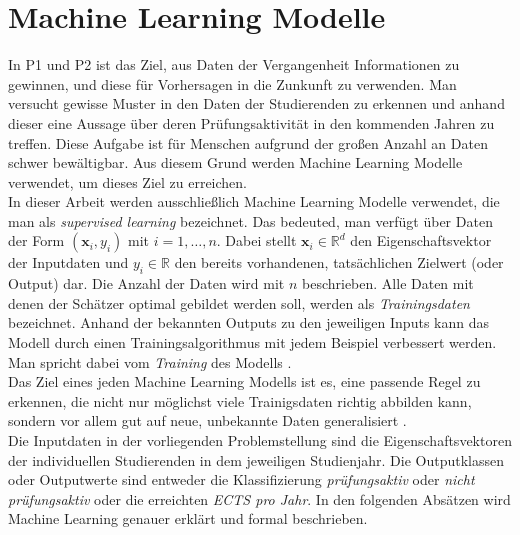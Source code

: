 
\section{Machine Learning Modelle}
\label{sec:ml}

In P1 und P2 ist das Ziel, aus Daten der Vergangenheit Informationen zu gewinnen, und diese f\"ur Vorhersagen in die Zunkunft zu verwenden.
Man versucht gewisse Muster in den Daten der Studierenden zu erkennen und anhand dieser eine Aussage \"uber deren Pr\"ufungsaktivit\"at in den kommenden Jahren zu treffen.
Diese Aufgabe ist f\"ur Menschen aufgrund der gro{\ss}en Anzahl an Daten schwer bew\"altigbar. Aus diesem Grund werden Machine Learning Modelle verwendet,
um dieses Ziel zu erreichen. \\

In dieser Arbeit werden ausschlie{\ss}lich Machine Learning Modelle verwendet, die man als \textit{supervised learning} bezeichnet.
Das bedeuted, man verf\"ugt \"uber Daten der Form $(\mathbf{x}_i, y_i)$ mit $i = 1,\dots,n$. Dabei stellt $\mathbf{x}_i \in \mathbb{R}^d$ den Eigenschaftsvektor
der Inputdaten und $y_i \in \mathbb{R}$ den bereits vorhandenen, tats\"achlichen Zielwert (oder Output) dar. Die Anzahl der Daten wird mit $n$ beschrieben. Alle Daten mit denen der
Sch\"atzer optimal gebildet werden soll, werden als \textit{Trainingsdaten} bezeichnet.
Anhand der bekannten Outputs zu den jeweiligen Inputs kann das Modell durch einen Trainingsalgorithmus mit jedem Beispiel verbessert werden.
Man spricht dabei vom \textit{Training} des Modells \cite[Seiten 19 bis 25]{shalev}. \\

Das Ziel eines jeden Machine Learning Modells ist es, eine passende Regel zu erkennen, die nicht nur m\"oglichst viele Trainigsdaten richtig abbilden kann, sondern vor allem
gut auf neue, unbekannte Daten generalisiert \cite[Seite 371]{strang}. \\

Die Inputdaten in der vorliegenden Problemstellung sind die Eigenschaftsvektoren der individuellen Studierenden in dem jeweiligen Studienjahr. Die Outputklassen oder
Outputwerte sind entweder die Klassifizierung \textit{pr\"ufungsaktiv} oder \textit{nicht pr\"ufungsaktiv} oder die erreichten \textit{ECTS pro Jahr}.
In den folgenden Abs\"atzen wird Machine Learning genauer erkl\"art und formal beschrieben. \\



